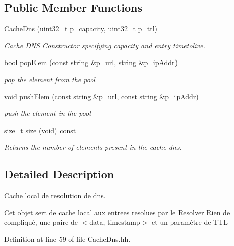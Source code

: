\subsection*{Public Member Functions}
\begin{DoxyCompactItemize}
\item 
\hyperlink{classxtd_1_1network_1_1utils_1_1CacheDns_ac74635760f1d9fb738d940e3dc723476}{Cache\+Dns} (uint32\+\_\+t p\+\_\+capacity, uint32\+\_\+t p\+\_\+ttl)
\begin{DoxyCompactList}\small\item\em Cache D\+NS Constructor specifying capacity and entry timetolive. \end{DoxyCompactList}\item 
bool \hyperlink{classxtd_1_1network_1_1utils_1_1CacheDns_ab409d08cb0159d6250db8d1d05c6617b}{pop\+Elem} (const string \&p\+\_\+url, string \&p\+\_\+ip\+Addr)
\begin{DoxyCompactList}\small\item\em pop the element from the pool \end{DoxyCompactList}\item 
void \hyperlink{classxtd_1_1network_1_1utils_1_1CacheDns_a1ac8401e5827dbfbc39a909c2cf7afdf}{push\+Elem} (const string \&p\+\_\+url, const string \&p\+\_\+ip\+Addr)
\begin{DoxyCompactList}\small\item\em push the element in the pool \end{DoxyCompactList}\item 
size\+\_\+t \hyperlink{classxtd_1_1network_1_1utils_1_1CacheDns_a05377d5ccc35a6ba0f6e7124c891be37}{size} (void) const 
\begin{DoxyCompactList}\small\item\em Returns the number of elements present in the cache dns. \end{DoxyCompactList}\end{DoxyCompactItemize}


\subsection{Detailed Description}
Cache local de resolution de dns. 

Cet objet sert de cache local aux entrees resolues par le \hyperlink{classxtd_1_1network_1_1utils_1_1Resolver}{Resolver} Rien de compliqué, une paire de $<$data, timestamp$>$ et un paramètre de T\+TL 

Definition at line 59 of file Cache\+Dns.\+hh.



